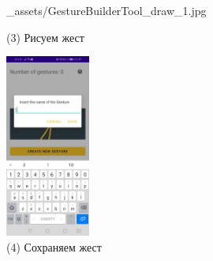 \documentclass[12pt, a4paper, simple]{eskdtext}
\begin{document}
\begin{figure}[!h]
\begin{minipage}{0.24\textwidth}
                {_assets/GestureBuilderTool_draw_1.jpg}
            \caption{(3) Рисуем жест}
            \label{fig:GestureBuilderTool_draw_1}
        \end{minipage}
        \begin{minipage}{0.24\textwidth}
            \centering
            \includegraphics[height=6cm]
                {_assets/GestureBuilderTool_save_1.jpg}
            \caption{(4) Сохраняем жест}
            \label{fig:GestureBuilderTool_save_1}
        \end{minipage}
    \end{figure}
\end{document}
